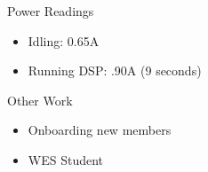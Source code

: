 \begin{frame}{Power Readings}
    \begin{itemize}
        \item Idling: 0.65A
        \item Running DSP: .90A (9 seconds)
    \end{itemize}    
\end{frame}

\begin{frame}{Other Work}
    \begin{itemize}
        \item Onboarding new members
        \item WES Student
    \end{itemize}    
\end{frame}

